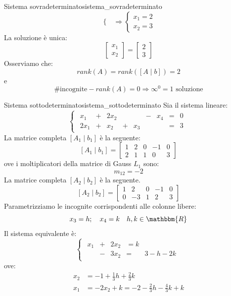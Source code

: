 \documentclass[12pt]{report}
\newcommand{\nmu}{}
\begin{document}
\begin{example}{\nmu Sistema sovradeterminato}{sistema_sovradeterminato}
\[\begin{cases}
\end{cases} \Rightarrow \begin{cases}
	x_1 = 2 \\
	x_2 = 3
\end{cases}
\]
La soluzione è unica:
\[
\begin{bmatrix}
	x_1 \\
	x_2
\end{bmatrix} = \begin{bmatrix}
	2 \\
	3
\end{bmatrix}
\]
Osserviamo che:
\[
rank(A) = rank([A\mid b]) = 2
\]
e
\[
\#\text{incognite} - rank(A) = 0  \Rightarrow \infty^0 = 1 \text{ soluzione}
\]
\end{example}
\begin{example}{\nmu Sistema sottodeterminato}{sistema_sottodeterminato}
Sia il sistema lineare:
\[
\begin{cases}
	\begin{array}{rcrcrcrcr}
	x_1 & + & 2x_2 & & & - & x_4 & = & 0 \\
	2x_1 & + & x_2 & + & x_3 & & & = & 3
	\end{array}
\end{cases}
\]
La matrice completa $[A_1 \mid b_1]$ è la seguente:
\[
[A_1 \mid b_1] = \left[
\begin{array}{rrrr|c}
1 & 2 & 0 & -1 & 0 \\
2 & 1 & 1 & 0 & 3
\end{array}
\right]
\]
ove i moltiplicatori della matrice di Gauss $L_1$ sono:
\[
m_{12} = -2
\]
La matrice completa $[A_2 \mid b_2]$ è la seguente.
\[
[A_2 \mid b_2] = \left[
\begin{array}{rrrr|c}
1 & 2 & 0 & -1 & 0 \\
0 & -3 & 1 & 2 & 3
\end{array}
\right]
\]
Parametrizziamo le incognite corrispondenti alle colonne libere:
\[
x_3 = h; \quad x_4 = k \quad h,k \in \mathbbm{R}
\]
Il sistema equivalente è:
\[
\begin{cases}
	\begin{array}{rcrcr}
	x_1 & + & 2x_2 & = k \\
	& - & 3x_2 & = & 3 - h - 2k
	\end{array}
\end{cases}
\]
ove:
\begin{align*}
x_2 &= -1 + \frac{1}{3}h + \frac{2}{3}k \\
x_1 &= -2x_2 + k = -2 - \frac{2}{3}h - \frac{4}{3}k + k \\

\end{align*}
\end{example}
\end{document}
